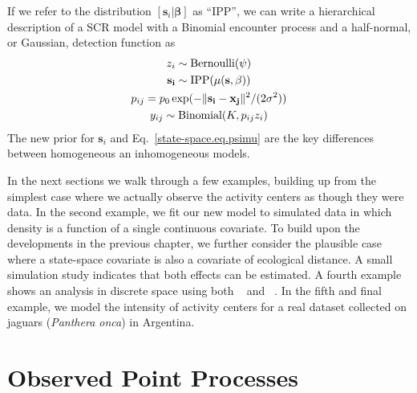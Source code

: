 If we refer to the distribution $[\mathbf{s}_i | \bm{\beta}]$ as
``IPP'', we can write a hierarchical description of a SCR model with a
Binomial encounter process and a half-normal, or Gaussian, detection function as
\begin{gather*}
z_i \sim \mbox{Bernoulli}(\psi) \\
{\bf s_i} \sim \mbox{IPP}(\mu(\mathbf{s},\beta)) \\
p_{ij} = p_0 \exp(-\|{\bf s_i} - {\bf x_{j}}\|^2/(2\sigma^2)) \\
y_{ij} \sim \mbox{Binomial}(K, p_{ij} z_i)
\end{gather*}
The new prior for $\mathbf{s}_i$ and Eq.~\ref{state-space.eq.psimu}
are the key differences between homogeneous an inhomogeneous
models.

In the next sections we walk through a few examples, building up from
the simplest case where we actually observe the activity centers as
though they were data. In the second example, we fit our new model to simulated
data in which density is a function of a single continuous
covariate. To build upon the developments in the previous chapter, we
further consider the plausible case where a state-space covariate is also a
covariate of ecological distance. A small simulation study indicates
that both effects can be estimated. A fourth example shows an analysis in discrete space using
both \secr~\citep{efford:2011} and \jags~\citep{plummer:2003}. In the
fifth and final example, we model the intensity of
activity centers for a real dataset collected on jaguars
(\emph{Panthera onca}) in Argentina.

\section{Observed Point Processes}

